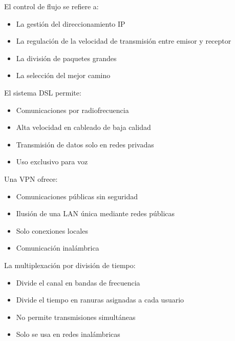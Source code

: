 \documentclass[11pt]{article}
\begin{document}
El control de flujo se refiere a:

\begin{itemize}
\item La gestión del direccionamiento IP

\item La regulación de la velocidad de transmisión entre emisor y receptor

\item La división de paquetes grandes

\item La selección del mejor camino
\end{itemize}

El sistema DSL permite:

\begin{itemize}
\item Comunicaciones por radiofrecuencia

\item Alta velocidad en cableado de baja calidad

\item Transmisión de datos solo en redes privadas

\item Uso exclusivo para voz
\end{itemize}

Una VPN ofrece:

\begin{itemize}
\item Comunicaciones públicas sin seguridad

\item Ilusión de una LAN única mediante redes públicas

\item Solo conexiones locales

\item Comunicación inalámbrica
\end{itemize}

La multiplexación por división de tiempo:

\begin{itemize}
\item Divide el canal en bandas de frecuencia

\item Divide el tiempo en ranuras asignadas a cada usuario

\item No permite transmisiones simultáneas

\item Solo se usa en redes inalámbricas
\end{itemize}
\end{document}
